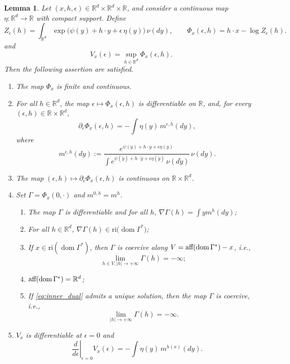 \documentclass[reqno, a4paper]{amsart}
\theoremstyle{plain}
\newtheorem{lemma}[theorem]{Lemma}
\theoremstyle{definition}
\theoremstyle{remark}
\numberwithin{equation}{section}
\numberwithin{theorem}{section}
\newcommand{\R}{\mathbb{R}}
\newcommand{\aff}{\textnormal{aff}}
\newcommand{\dom}{\operatorname{dom}}
\begin{document}
	\begin{lemma}\label{lem:application_Danskin}
		Let $(x ,h ,\epsilon) \in \R^d \times \R^d \times \R$, and consider a continuous map $\eta: \R^d \to \R$ with compact support. Define
		\[
		Z_\epsilon(h)
		=
		\int_{\R^d}\exp\big(\psi(y)+h\cdot y+\epsilon\,\eta(y)\big)\,\nu(dy),
		\qquad
		\Phi_x(\epsilon,h)
		=
		h\cdot x-\log Z_\epsilon(h).
		\]
		and 
		\[
		V_x(\epsilon)
		=
		\sup_{h\in\R^d}\Phi_x(\epsilon,h).
		\]
		Then the following assertion are satisfied.
		\begin{enumerate}
			\item The map  $\Phi_x$ is finite and continuous.
			\item\label{point:formul_diff} For all $h\in\R^d$, the map
			$\epsilon\mapsto \Phi_x(\epsilon,h)$ is differentiable on $\R$, and, for every $(\epsilon,h) \in \R \times \R^d$,
			\[
			\partial_\epsilon\Phi_x(\epsilon,h)
			=
			-\int \eta(y)\,m^{\epsilon,h}(dy),
			\]
			where
			\[
			m^{\epsilon,h}(dy)
			:=
			\frac{e^{\psi(y)+h\cdot y+\epsilon \eta(y)}}
			{\int e^{\psi(\tilde y)+h\cdot \tilde y+\epsilon \eta(\tilde y)}\,\nu(d \tilde y)}\,\nu(dy).
			\] 
			\item The map
			$(\epsilon, h) \mapsto \partial_\epsilon\Phi_x(\epsilon,h)$ is continuous on $\R\times\R^d$.
			\item
			Set $\Gamma = \Phi_x(0,\cdot)$ and $m^{0,h}=m^h.$
			\begin{enumerate}
				\item\label{point:Z_0_diff} The map $\Gamma$ is differentiable and for all $h$, $\nabla \Gamma (h) =  \int y m^h(dy)$;
				\item\label{point:gradient_in_rel_int} For all $h \in \R^d$, $\nabla \Gamma(h)\in \mathrm{ri}\big(\dom  \Gamma^*\big)$;
				\item\label{point:coercitivity_on_affine_span} If $x\in \mathrm{ri}(\dom \Gamma^*)$, then  $\Gamma$ is coercive along $V=\aff(\dom \Gamma^*)-x$, i.e.,
				$$\lim_{ h\in V, |h| \to +\infty} \Gamma(h) = -\infty;$$
				\item\label{point:affine_is_full} $\aff(\dom \Gamma^*) = \R^d$;
				\item\label{point:full_coercitvity} If \eqref{eq:inner_dual} admits a unique solution, then the map $\Gamma$ is coercive,  i.e., $$\lim_{|h| \to +\infty} \Gamma(h) = -\infty.$$
			\end{enumerate}
			
			\item $V_x$ is differentiable at $\epsilon=0$ and
			\[
			\left.\frac{d}{d\epsilon}\right|_{\epsilon=0}
			V_x(\epsilon)
			=
			-\int \eta(y)\,m^{h(x)}(dy).
			\]
		\end{enumerate}
	\end{lemma}
	
\end{document}
